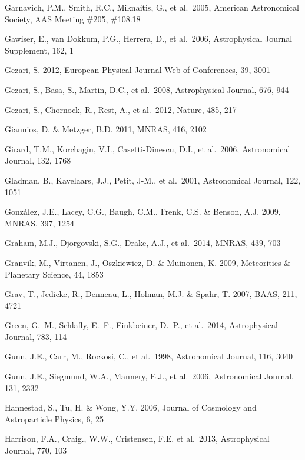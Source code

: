 \documentclass{emulateapj}
\begin{document}
\begin{thebibliography}{}
\bibitem[()]{} Garnavich, P.M., Smith, R.C., Miknaitis, G., et al.~2005, 
             American Astronomical Society, AAS Meeting \#205, \#108.18 	

\bibitem[()]{} Gawiser, E., van Dokkum, P.G., Herrera, D., et al.~2006, Astrophysical Journal Supplement, 162, 1 

	
\bibitem[()]{} Gezari, S. 2012, European Physical Journal Web of Conferences, 39, 3001

\bibitem[()]{} Gezari, S., Basa, S., Martin, D.C., et al.~2008, Astrophysical Journal, 676, 944

\bibitem[()]{} Gezari, S., Chornock, R., Rest, A., et al.~2012, Nature, 485, 217 

\bibitem[()]{} Giannios, D. \& Metzger, B.D. 2011, MNRAS, 416, 2102

\bibitem[()]{} Girard, T.M., Korchagin, V.I., Casetti-Dinescu, D.I., et al.~2006, Astronomical 
             Journal, 132, 1768

\bibitem[()]{} Gladman, B., Kavelaars, J.J., Petit, J-M., et al.~2001, Astronomical Journal, 122, 1051

\bibitem[()]{} Gonz\'{a}lez, J.E., Lacey, C.G., Baugh, C.M., Frenk, C.S. \& Benson, A.J. 2009, MNRAS, 397, 1254

\bibitem[()]{} Graham, M.J., Djorgovski, S.G., Drake, A.J., et al.~2014, MNRAS, 439, 703 

\bibitem[()]{} Granvik, M., Virtanen, J., Oszkiewicz, D. \& Muinonen, K. 2009, Meteoritics \& Planetary Science, 44, 1853

\bibitem[()]{} Grav, T., Jedicke, R., Denneau, L., Holman, M.J.  \& Spahr, T. 2007, BAAS, 211, 4721

\bibitem[()]{} Green, G.~M., Schlafly, E.~F., Finkbeiner, D.~P., et al.~2014, Astrophysical Journal, 783, 114 

\bibitem[()]{} Gunn, J.E., Carr, M., Rockosi, C., et al.~1998, Astronomical Journal, 116, 3040

\bibitem[()]{} Gunn, J.E., Siegmund, W.A., Mannery, E.J., et al.~2006, Astronomical Journal, 131, 2332

\bibitem[()]{} Hannestad, S., Tu, H. \& Wong, Y.Y. 2006, Journal of Cosmology and Astroparticle 
             Physics, 6, 25

\bibitem[()]{} Harrison, F.A., Craig., W.W., Cristensen, F.E. et
  al.~2013, Astrophysical Journal, 770, 103


\end{thebibliography}
\end{document}
